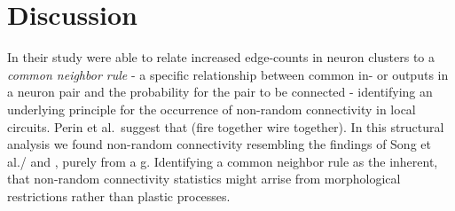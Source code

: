 

\section{Discussion}\label{sec:discussion}



In their study \textcite{Perin2011} were able to relate increased
edge-counts in neuron clusters to a \textit{common neighbor rule} - a
specific relationship between common in- or outputs in a neuron pair
and the probability for the pair to be connected - identifying an
underlying principle for the occurrence of non-random connectivity in
local circuits. Perin et al.\ suggest that (fire together wire
together). In this structural analysis we found non-random
connectivity resembling the findings of Song et al./ and , purely from
a g. Identifying a common neighbor rule as the inherent, that
non-random connectivity statistics might arrise from morphological
restrictions rather than plastic processes.



















